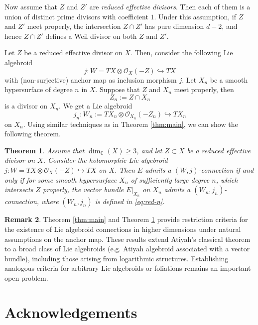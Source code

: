 \documentclass[12pt,reqno]{amsart}
\numberwithin{equation}{section}
\newtheorem{theorem}{Theorem}[section]
\theoremstyle{definition}
\newtheorem{remark}[theorem]{Remark}
\begin{document}
Now assume that $Z$ and $Z'$ are \emph{reduced effective divisors}. Then each of them is a union of distinct 
prime divisors with coefficient $1$. Under this assumption, if $Z$ and $Z'$ meet properly, the intersection 
$Z \cap Z'$ has pure dimension $d-2$, and hence $Z \cap Z'$ defines a Weil divisor on both $Z$ and $Z'$.

Let $Z$ be a reduced effective divisor on $X$. Then, consider the following Lie algebroid
\begin{equation}
\label{eq:red}
j :  W  =  TX \otimes \mathcal{O}_X(-Z)  \hookrightarrow  TX
\end{equation}
 with (non-surjective) anchor map as inclusion morphism $j$. Let $X_n$ be a smooth
hypersurface of degree $n$ in $X$. Suppose that $Z$ and $X_n$ meet properly, then 
$$
Z_n  :=  Z \cap X_n
$$ is a divisor on $X_n$. We get a Lie algebroid 
\begin{equation}
\label{eq:red-n}
j_n  :  W_n  :=  TX_n \otimes \mathcal{O}_{X_n}(-Z_n)  \hookrightarrow  TX_n
\end{equation}
on $X_n$. Using similar techniques as in Theorem \ref{thm:main}, we can show the following theorem. 

\begin{theorem} \label{thm:red}
Assume that $\dim_{\mathbb{C}}(X)  \ge  3$, and let $Z  \subset  X$ be a reduced effective divisor
on $X$. Consider the holomorphic Lie algebroid $j :  W  =  TX \otimes \mathcal{O}_X(-Z)  \hookrightarrow  TX $
on $X$. Then $E$ admits a $(W, j)$-connection if and only if for some smooth
hypersurface $X_n$ of sufficiently large degree $n$, which intersects $Z$ properly, the vector
bundle $E\big\vert_{X_n}$ on $X_n$ admits a $(W_n,  j_n)$-connection, where $(W_n,  j_n)$ is
defined in \eqref{eq:red-n}.
\end{theorem}

\begin{remark}
Theorem \ref{thm:main} and Theorem \ref{thm:red} provide restriction criteria for the existence of Lie algebroid connections in higher dimensions under natural assumptions on the anchor map. These results extend Atiyah’s classical theorem to a broad class of Lie algebroids (e.g. Atiyah algebroid associated with a vector bundle), including those arising from logarithmic structures. Establishing analogous criteria for arbitrary
Lie algebroids or foliations remains an important open problem.
\end{remark}

\section*{Acknowledgements}
\end{document}
